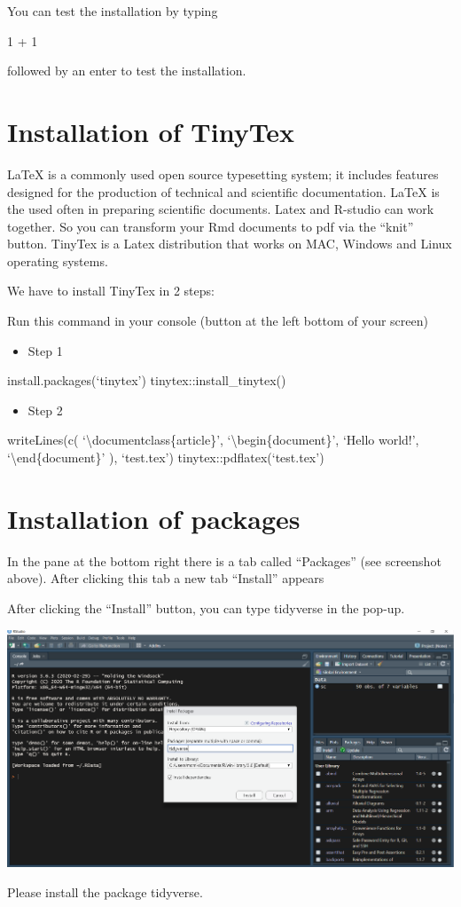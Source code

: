 \documentclass[
]{book}
\providecommand{\tightlist}{%
  \setlength{\itemsep}{0pt}\setlength{\parskip}{0pt}}
\begin{document}
You can test the installation by typing

1 + 1

followed by an enter to test the installation.

\hypertarget{installation-of-tinytex}{%
\section{Installation of TinyTex}\label{installation-of-tinytex}}

LaTeX is a commonly used open source typesetting system; it includes features designed for the production of technical and scientific documentation. LaTeX is the used often in preparing scientific documents.
Latex and R-studio can work together. So you can transform your Rmd documents to pdf via the ``knit'' button.
TinyTex is a Latex distribution that works on MAC, Windows and Linux operating systems.

We have to install TinyTex in 2 steps:

Run this command in your console (button at the left bottom of your screen)

\begin{itemize}
\tightlist
\item
  Step 1
\end{itemize}

install.packages(`tinytex')
tinytex::install\_tinytex()

\begin{itemize}
\tightlist
\item
  Step 2
\end{itemize}

writeLines(c(
`\textbackslash documentclass\{article\}',
`\textbackslash begin\{document\}', `Hello world!', `\textbackslash end\{document\}'
), `test.tex')
tinytex::pdflatex(`test.tex')

\hypertarget{installation-of-packages}{%
\section{Installation of packages}\label{installation-of-packages}}

In the pane at the bottom right there is a tab called ``Packages'' (see screenshot above).
After clicking this tab a new tab ``Install'' appears

After clicking the ``Install'' button, you can type tidyverse in the pop-up.

\includegraphics{install.PNG}

Please install the package tidyverse.

  
\end{document}
